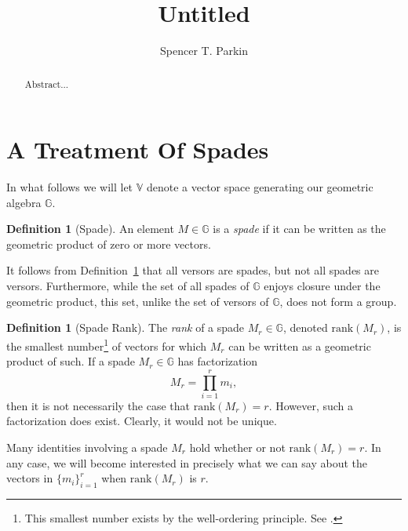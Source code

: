 \documentclass{birkjour}
\theoremstyle{definition}
\newtheorem{defn}[thm]{Definition}
\theoremstyle{remark}
\numberwithin{equation}{section}
\newcommand{\G}{\mathbb{G}}
\newcommand{\V}{\mathbb{V}}
\newcommand{\rank}{\mbox{rank}}
\begin{document}
\title{Untitled}

\author{Spencer T. Parkin}



\begin{abstract}
Abstract...
\end{abstract}


\maketitle

\section{A Treatment Of Spades}

In what follows we will let $\V$ denote a vector space generating our geometric algebra $\G$.

\begin{defn}[Spade]\label{def_spade}
An element $M\in\G$ is a \emph{spade} if it can be written as the geometric
product of zero or more vectors.
\end{defn}

It follows from Definition~\ref{def_spade} that all versors are spades, but not all spades are versors.
Furthermore, while the set of all spades of $\G$ enjoys closure under the geometric product, this set,
unlike the set of versors of $\G$, does not form a group.

\begin{defn}[Spade Rank]\label{def_spader_rank}
The \emph{rank} of a spade $M_r\in\G$, denoted $\rank(M_r)$, is the smallest number\footnote{This smallest number exists
by the well-ordering principle.  See \cite{}.} of vectors for which $M_r$ can
be written as a geometric product of such.  If a spade $M_r\in\G$ has factorization
\begin{equation}\label{equ_M_r_factorization}
M_r=\prod_{i=1}^r m_i,
\end{equation}
then it is not necessarily the case that $\rank(M_r)=r$.  However, such a factorization does exist.  Clearly, it
would not be unique.
\end{defn}

Many identities involving a spade $M_r$ hold whether or not $\rank(M_r)=r$.
In any case, we will become interested in precisely what we can say about the
vectors in $\{m_i\}_{i=1}^r$ when $\rank(M_r)$ is $r$.
\end{document}
